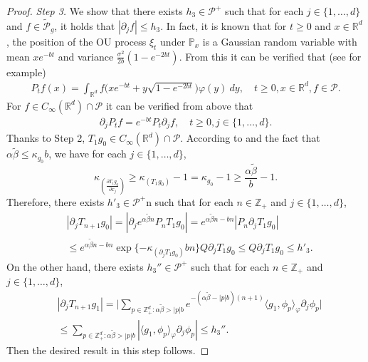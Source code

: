 \documentclass[12pt,a4paper]{amsart}
\theoremstyle{plain}
\theoremstyle{definition}
\numberwithin{equation}{section}
\begin{document}
\begin{proof}
  \emph{Step 3.} We show that there exists $h_3 \in \mathcal P^+$ such that for each $j \in \{1,\dots, d\}$ and $f \in \widetilde {\mathcal P}_g$, it holds that $|\partial_j f| \leq h_3$.
  In fact, it is known that for $t\geq 0$ and $x\in \mathbb R^d$, the position of the OU process $\xi_t$ under $\mathbb P_x$ is a Gaussian random variable with mean $xe^{-bt}$ and variance $\frac{\sigma^2}{2b} (1- e^{-2bt})$. From this it can be verified that (see \cite{MetafunePallaraPriola2002Spectrum} for example)
  \begin{align}
    \label{eq:P:R:3:-1}
    P_t f(x) 
    = \int_{\mathbb R^d} f\big(x e^{-bt} + y \sqrt{1-e^{-2bt}}\big) \varphi(y)~dy,
    \quad t\geq 0, x\in \mathbb R^d, f\in \mathcal P.
  \end{align}
  For $f \in C_\infty(\mathbb R^d)\cap \mathcal P$ it can be verified from above that
  \begin{align}
    \label{eq:P:R:3:1}
    \partial_j P_t f 
    = e^{-bt} P_t \partial_j f,
    \quad t \geq 0, j \in \{1,\dots, d\}.
  \end{align}
  Thanks to Step 2, $T_1 g_0 \in C_\infty(\mathbb R^d)\cap \mathcal P$.
  According to \cite[Fact 1.3]{MarksMilos2018CLT} and the fact that $\alpha \tilde \beta \leq \kappa _{g_0} b$, we have for each $j \in \{1,\dots, d\}$,
  \[
    \kappa_{(\frac{\partial T_1 g_0}{\partial x_j})}
    \geq \kappa_{(T_1 g_0)} - 1
    = \kappa_{g_0} - 1
    \geq \frac{\alpha \tilde \beta}{b} - 1.
  \]
  Therefore, there exists  $h'_3\in \mathcal P^+$n such that for each $n \in \mathbb Z_+$ and $j\in \{1,\dots,d\}$,
  \begin{align}
    & | \partial_j T_{n+1}g_0 |
      = | \partial_j e^{\alpha \tilde \beta n}P_n T_1g_0 |
      = e^{\alpha \tilde \beta n-bn} |P_n \partial_j T_1 g_0| \\
    & \leq e^{\alpha \tilde \beta n-bn} \exp\{-\kappa_{(\partial_j T_1 g_0)}bn\}Q \partial_j T_1g_0
      \leq Q\partial_j T_1g_0
      \leq h'_3.
  \end{align}
  On the other hand, there exists $h_3''\in \mathcal P^+$ such that for each $n \in \mathbb Z_+$ and $j\in \{1,\dots,d\}$,
  \begin{align}
    & |\partial_j T_{n+1}g_1 |
      = \Big| \sum_{p\in \mathbb Z_+^d: \alpha \tilde \beta > |p|b} e^{- (\alpha \tilde \beta - |p|b)(n+1)} \langle g_1, \phi_p \rangle_\varphi \partial_j \phi_p \Big| \\
    & \leq \sum_{p\in \mathbb Z_+^d: \alpha \tilde \beta > |p|b} |\langle g_1, \phi_p \rangle_\varphi \partial_j \phi_p |
      \leq h_3''.
  \end{align}
  Then the desired result in this step follows.


\end{proof}
\end{document}
